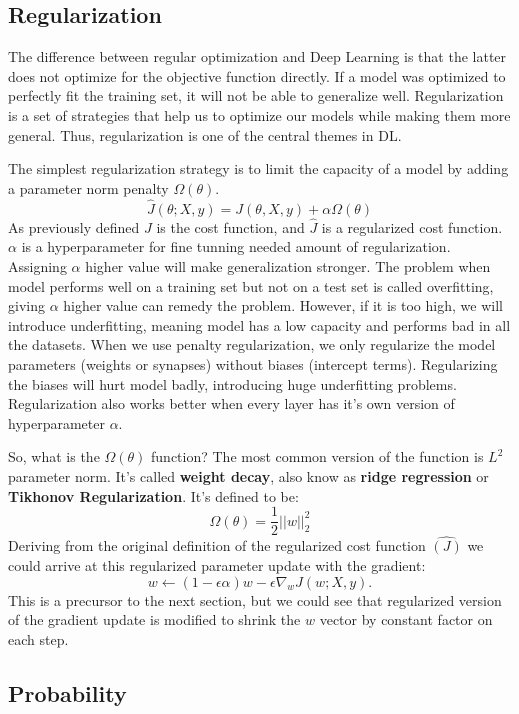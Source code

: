 \documentclass[paper=a4, fontsize=11pt]{scrartcl}
\numberwithin{equation}{section}		%
\numberwithin{figure}{section}			%
\numberwithin{table}{section}			%
\begin{document}
	\subsection{Regularization}
	The difference between regular optimization and Deep Learning is that the latter does not optimize for the objective function directly. If a model was optimized to perfectly fit the training set, it will not be able to generalize well. Regularization is a set of strategies that help us to optimize our models while making them more general. Thus, regularization is one of the central themes in DL. \par
	The simplest regularization strategy is to limit the capacity of a model by adding a parameter norm penalty $ \Omega(\theta) $.
	$$ 
	\hat{J}(\theta;X,y) = J(\theta,X,y) + \alpha\Omega(\theta) 
	$$ 
	As previously defined $J$ is the cost function, and $\hat{J}$ is a regularized cost function. $\alpha$ is a hyperparameter for fine tunning needed amount of regularization. Assigning $\alpha$ higher value will make generalization stronger. The problem when model performs well on a training set but not on a test set is called overfitting, giving $\alpha$ higher value can remedy the problem. However, if it is too high, we will introduce underfitting, meaning model has a low capacity and performs bad in all the datasets. When we use penalty regularization, we only regularize the model  parameters (weights or synapses) without biases (intercept terms). Regularizing the biases will hurt model badly, introducing huge underfitting problems. Regularization also works better when every layer has it's own version of hyperparameter $\alpha$. \par
	So, what is the $\Omega(\theta)$ function? The most common version of the function is $L^2$ parameter norm. It's called \textbf{weight decay}, also know as \textbf{ridge regression} or \textbf{Tikhonov Regularization}. It's defined to be:
	$$ 
	\Omega(\theta) = \frac{1}{2}||w||_2^2
	$$
	Deriving from the original definition of the regularized cost function $\hat{(J)}$ we could arrive at this regularized parameter update with the gradient:
	$$
	w \leftarrow (1-\epsilon\alpha)w - \epsilon \nabla_w J(w;X,y).
	$$
	This is a precursor to the next section, but we could see that regularized version of the gradient update is modified to shrink the $w$ vector by constant factor on each step.
	\subsection{Probability}
\end{document}
